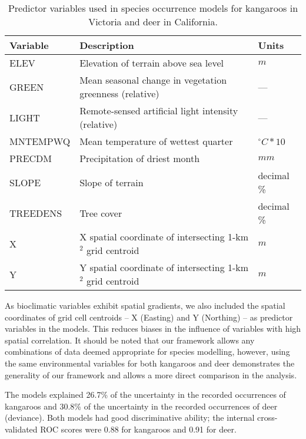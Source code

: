 \begin{table}[!h]
\caption[Predictor variables used in species occurrence models for kangaroos and deer]{Predictor variables used in species occurrence models for kangaroos in Victoria and deer in California.}
\centering
\begin{tabularx}{0.9\textwidth}{lll} \toprule
Variable 	&Description 												&Units \\ \midrule 
ELEV 		&Elevation of terrain above sea level 						&$m$\\
GREEN 		&Mean seasonal change in vegetation greenness (relative) 	&---\\
LIGHT 		&Remote-sensed artificial light intensity (relative) 		&---\\ 
MNTEMPWQ 	&Mean temperature of wettest quarter 						&$^{\circ}C*10$\\
PRECDM 		&Precipitation of driest month 								&$mm$\\
SLOPE 		&Slope of terrain 											&decimal \%\\ 
TREEDENS 	&Tree cover 												&decimal \%\\ 
X 			&X spatial coordinate of intersecting 1-km$^2$ grid centroid &$m$\\
Y 			&Y spatial coordinate of intersecting 1-km$^2$ grid centroid &$m$\\
\bottomrule
\end{tabularx}
\label{cal_vic_vars}
\end{table}

As bioclimatic variables exhibit spatial gradients, we also included the spatial coordinates of grid cell centroids -- X (Easting) and Y (Northing) -- as predictor variables in the models.  This reduces biases in the influence of variables with high spatial correlation.  It should be noted that our framework allows any combinations of data deemed appropriate for species modelling, however, using the same environmental variables for both kangaroos and deer demonstrates the generality of our framework and allows a more direct comparison in the analysis.

The models explained 26.7\% of the uncertainty in the recorded occurrences of kangaroos and 30.8\% of the uncertainty in the recorded occurrences of deer (deviance). Both models had good discriminative ability; the internal cross-validated ROC scores were 0.88 for kangaroos and 0.91 for deer.

